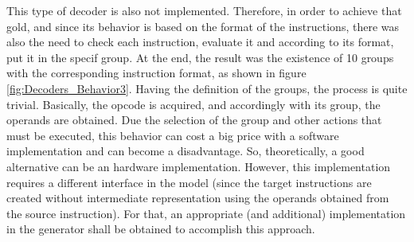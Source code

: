     This type of decoder is also not implemented. Therefore, in order to achieve that gold, and since its behavior is based on the format of the instructions, there was also the need to check each instruction, evaluate it and according to its format, put it in the specif group. At the end, the result was the existence of 10 groups with the corresponding instruction format, as shown in figure \ref{fig:Decoders_Behavior3}. 
	Having the definition of the groups, the process is quite trivial. Basically, the opcode is acquired, and accordingly with its group, the operands are obtained. Due the selection of the group and other actions that must be executed, this behavior can cost a big price with a software implementation and can become a disadvantage. So, theoretically, a good alternative can be an hardware implementation. However, this implementation requires a different interface in the model (since the target instructions are created without intermediate representation using the operands obtained from the source instruction). For that, an appropriate (and additional) implementation in the generator shall be obtained to accomplish this approach. 